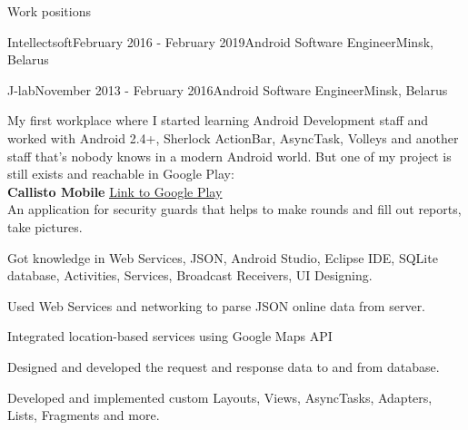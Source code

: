 \documentclass{resume} %
\begin{document}
\begin{rSection}{Work positions}
\begin{rSubsection}{Intellectsoft}{February 2016 - February 2019}{Android Software Engineer}{Minsk, Belarus}
\end{rSubsection}


\begin{rSubsection}{J-lab}{November 2013 - February 2016}{Android Software Engineer}{Minsk, Belarus}
\item[] My first workplace where I started learning Android Development staff and worked with Android 2.4+, Sherlock ActionBar, AsyncTask, Volleys and another staff that's nobody knows in  a modern Android world. But one of my project is still exists and reachable in Google Play: \smallskip \\
\textbf{Callisto Mobile}  \hfill\underline{\href{https://play.google.com/store/apps/details?id=com.jerminal.callistomobile}{Link to Google Play}}\\
An application for security guards that helps to make rounds and fill out reports, take pictures.\\

\item Got knowledge in Web Services, JSON, Android Studio, Eclipse IDE, SQLite database,
Activities, Services, Broadcast Receivers, UI Designing. 
\item Used Web Services and networking to parse JSON online data from server.
\item Integrated location-based services using Google Maps API
\item Designed and developed the request and response data to and from database.
\item Developed and implemented custom Layouts, Views, AsyncTasks, Adapters, Lists, Fragments and more.
\end{rSubsection}



\end{rSection}


\end{document}
